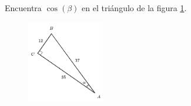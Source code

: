 \question[15] Encuentra $\cos(\beta)$ en el triángulo de la figura \ref{fig:functrig04}.
\begin{figure}[H]
    \begin{center}
        \includegraphics[width=0.3\textwidth]{../images/functrig04.png}
    \end{center}
    \caption{}
    \label{fig:functrig04}
\end{figure}
